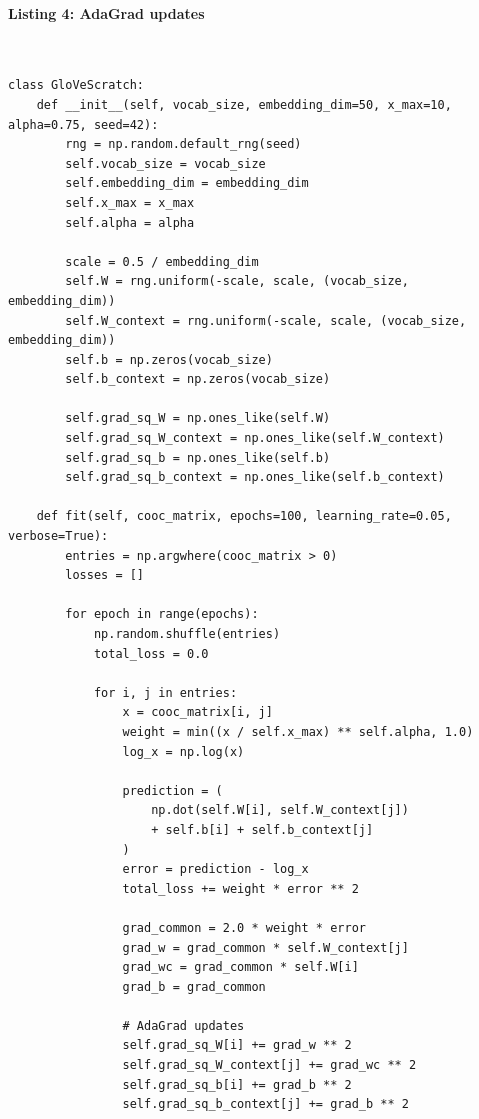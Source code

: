 \documentclass[12pt,a4paper,oneside]{report}
\begin{document}
\paragraph{Listing 4: AdaGrad updates}\mbox{}\\[-1ex]
\begin{Verbatim}[commandchars=\\\{\},breaklines=true,breakanywhere=true,fontsize=\scriptsize,frame=leftline,framesep=2mm,rulecolor=\color{gray}]
class GloVeScratch:
    def __init__(self, vocab_size, embedding_dim=50, x_max=10, alpha=0.75, seed=42):
        rng = np.random.default_rng(seed)
        self.vocab_size = vocab_size
        self.embedding_dim = embedding_dim
        self.x_max = x_max
        self.alpha = alpha

        scale = 0.5 / embedding_dim
        self.W = rng.uniform(-scale, scale, (vocab_size, embedding_dim))
        self.W_context = rng.uniform(-scale, scale, (vocab_size, embedding_dim))
        self.b = np.zeros(vocab_size)
        self.b_context = np.zeros(vocab_size)

        self.grad_sq_W = np.ones_like(self.W)
        self.grad_sq_W_context = np.ones_like(self.W_context)
        self.grad_sq_b = np.ones_like(self.b)
        self.grad_sq_b_context = np.ones_like(self.b_context)

    def fit(self, cooc_matrix, epochs=100, learning_rate=0.05, verbose=True):
        entries = np.argwhere(cooc_matrix > 0)
        losses = []

        for epoch in range(epochs):
            np.random.shuffle(entries)
            total_loss = 0.0

            for i, j in entries:
                x = cooc_matrix[i, j]
                weight = min((x / self.x_max) ** self.alpha, 1.0)
                log_x = np.log(x)

                prediction = (
                    np.dot(self.W[i], self.W_context[j])
                    + self.b[i] + self.b_context[j]
                )
                error = prediction - log_x
                total_loss += weight * error ** 2

                grad_common = 2.0 * weight * error
                grad_w = grad_common * self.W_context[j]
                grad_wc = grad_common * self.W[i]
                grad_b = grad_common

                # AdaGrad updates
                self.grad_sq_W[i] += grad_w ** 2
                self.grad_sq_W_context[j] += grad_wc ** 2
                self.grad_sq_b[i] += grad_b ** 2
                self.grad_sq_b_context[j] += grad_b ** 2


\end{Verbatim}
\end{document}
